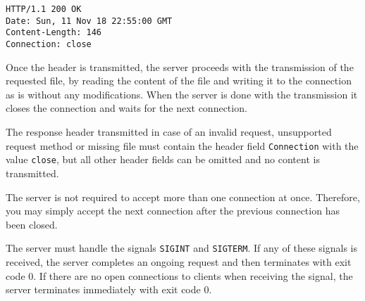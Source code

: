 \begin{verbatim}
HTTP/1.1 200 OK
Date: Sun, 11 Nov 18 22:55:00 GMT
Content-Length: 146
Connection: close
\end{verbatim}

Once the header is transmitted,
the server proceeds with the transmission of the requested file,
by reading the content of the file and writing it to the connection as is
without any modifications.
When the server is done with the transmission it closes the connection
and waits for the next connection.

The response header transmitted in case of an invalid request,
unsupported request method or missing file must contain
the header field \verb|Connection| with the value \verb|close|,
but all other header fields can be omitted and no content is transmitted.

The server is not required to accept more than one connection at once.
Therefore, you may simply accept the next connection
after the previous connection has been closed.

The server must handle the signals \verb|SIGINT| and \verb|SIGTERM|.
If any of these signals is received,
the server completes an ongoing request
and then terminates with exit code 0.
If there are no open connections to clients when receiving the signal,
the server terminates immediately with exit code 0.

